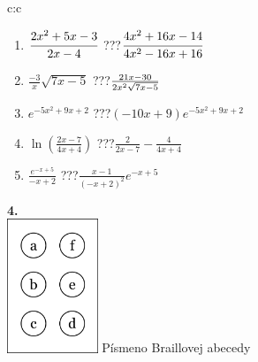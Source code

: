 \documentclass[10pt]{report}
\begin{document}
\begin{tabular}{c:c}
\begin{minipage}[c][104.5mm][t]{0.5\linewidth}
\begin{center}
\begin{minipage}{0.79\linewidth}
\begin{center}
\begin{varwidth}{\linewidth}
\begin{enumerate}
\item $\cfrac{2x^2+5x-3}{2x-4}$\quad \dotfill\; ???\;\dotfill \quad $\cfrac{4x^2+16x-14}{4x^2-16x+16}$
\item $\frac{-3}{x}\sqrt{7x-5}$\quad \dotfill\; ???\;\dotfill \quad $\frac{21x-30}{2x^2 \sqrt{\smash[b]{7x-5}}}$
\item $e^{-5x^2+9x+2}$\quad \dotfill\; ???\;\dotfill \quad $(-10x+9)e^{-5x^2+9x+2}$
\item $\ln{\left(\frac{2x-7}{4x+4}\right)}$\quad \dotfill\; ???\;\dotfill \quad $\frac{2}{2x-7}-\frac{4}{4x+4}$
\item $\frac{e^{-x+5}}{-x+2}$\quad \dotfill\; ???\;\dotfill \quad $\frac{x-1}{(-x+2)^2}e^{-x+5}$
\end{enumerate}
\end{varwidth}
\end{center}
\end{minipage}
\begin{minipage}{0.20\linewidth}
\begin{center}
{\Huge\bfseries 4.} \\[2mm]
\includegraphics[height=40mm]{../images/braille.png}
{\small Písmeno Braillovej abecedy}
\end{center}
\end{minipage}
\end{center}
\end{minipage}
%
\end{tabular}
\newpage
\thispagestyle{empty}
\end{document}
